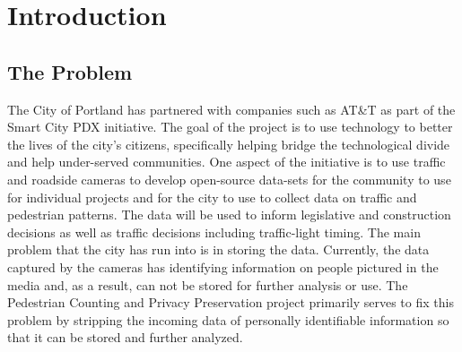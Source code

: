\documentclass[onecolumn, draftclsnofoot,10pt, compsoc]{IEEEtran}
\begin{document}
\begin{titlepage}
\begin{singlespace}
\begin{abstract}
        \end{abstract}     
    \end{singlespace}
\end{titlepage}
\newpage
{}
\tableofcontents
\clearpage

\section{Introduction}
\subsection{The Problem}
The City of Portland has partnered with companies such as AT\&T as part of the Smart City PDX initiative. The goal of the project is to use technology to better the lives of the city's citizens, specifically helping bridge the technological divide and help under-served communities. One aspect of the initiative is to use traffic and roadside cameras to develop open-source data-sets for the community to use for individual projects and for the city to use to collect data on traffic and pedestrian patterns. The data will be used to inform legislative and construction decisions as well as traffic decisions including traffic-light timing. The main problem that the city has run into is in storing the data. Currently, the data captured by the cameras has identifying information on people pictured in the media and, as a result, can not be stored for further analysis or use. The Pedestrian Counting and Privacy Preservation project primarily serves to fix this problem by stripping the incoming data of personally identifiable information so that it can be stored and further analyzed.
\end{document}
